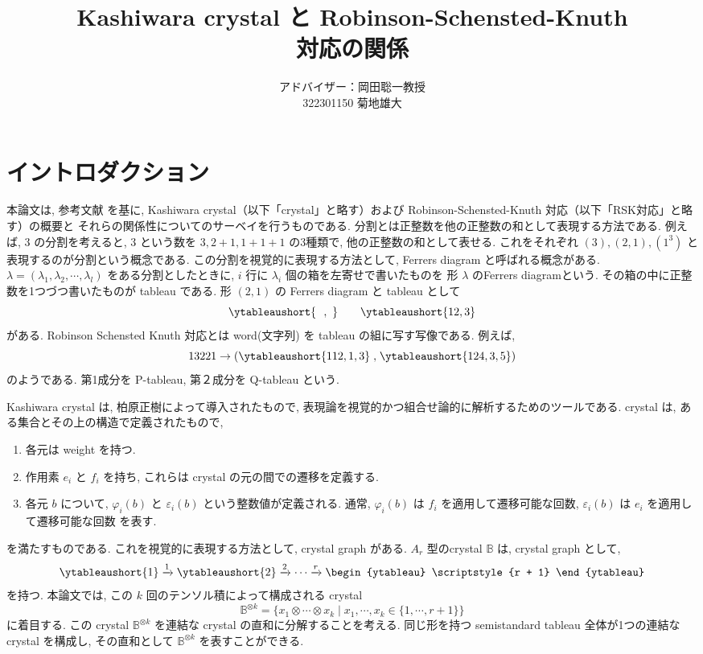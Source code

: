 \documentclass[
  a4paper, 
  12pt,
  ja=standard,
  xelatex,
  left=30truemm,
  right=30truemm,
  titlepage 
]{bxjsarticle}
\title{Kashiwara crystal と  Robinson-Schensted-Knuth \\ 対応の関係 \\[50pt]}
\author{
  アドバイザー：岡田聡一教授\\[20pt]
  322301150 \quad 菊地雄大
}
\date{}
\theoremstyle{definition}
\begin{document}
\maketitle
\thispagestyle{empty}

\setcounter{page}{1}

\tableofcontents
\clearpage

\section{イントロダクション}
本論文は, 参考文献 \cite{b2} を基に, 
Kashiwara crystal（以下「crystal」と略す）および Robinson-Schensted-Knuth 対応（以下「RSK対応」と略す）の概要と 
それらの関係性についてのサーベイを行うものである.
分割とは正整数を他の正整数の和として表現する方法である.
例えば, $3$ の分割を考えると, $3$ という数を $3, 2 + 1, 1 + 1 + 1$ の3種類で, 他の正整数の和として表せる.
これをそれぞれ $(3), (2, 1), (1^3)$ と表現するのが分割という概念である.
この分割を視覚的に表現する方法として, Ferrers diagram と呼ばれる概念がある.
$\lambda = (\lambda_1, \lambda_2, \cdots, \lambda_l)$ をある分割としたときに, 
$i$ 行に $\lambda_i$ 個の箱を左寄せで書いたものを 形 $\lambda$ のFerrers diagramという.
その箱の中に正整数を1つづつ書いたものが tableau である.
形 $(2, 1)$ の Ferrers diagram と tableau として
\[
\ytableaushort{~~,~} \qquad
\ytableaushort{12,3}
\]
がある.
Robinson Schensted Knuth 対応とは
word(文字列) を tableau の組に写す写像である. 
例えば, 
$$13221 
\rightarrow
\left( 
  \ytableaushort{112,1,3}
 \mathrel{,} 
  \ytableaushort{124,3,5}
\right)
$$
のようである.
第1成分を P-tableau, 第２成分を Q-tableau という.

Kashiwara crystal は, 柏原正樹によって導入されたもので, 
表現論を視覚的かつ組合せ論的に解析するためのツールである.
crystal は, ある集合とその上の構造で定義されたもので,
\begin{enumerate}
  \item 各元は weight を持つ.
  \item 作用素 $e_i$ と $f_i$ を持ち, これらは crystal の元の間での遷移を定義する.
  \item 各元 $b$ について, $\varphi_i(b)$ と $\varepsilon_i(b)$ という整数値が定義される.
  通常, $\varphi_i(b)$ は $f_i$ を適用して遷移可能な回数,
  $\varepsilon_i(b)$ は $e_i$ を適用して遷移可能な回数 を表す.
\end{enumerate}
を満たすものである. これを視覚的に表現する方法として, crystal graph がある.
$A_r$ 型のcrystal $\mathbb{B}$ は, crystal graph として,
\[
  \ytableaushort{1}
  \xrightarrow{1}
  \ytableaushort{2}
  \xrightarrow{2}
  \cdots
  \xrightarrow{r}
  \begin{ytableau}
    \scriptstyle{r + 1}
  \end{ytableau}
\]
を持つ. 
本論文では, この $k$ 回のテンソル積によって構成される crystal 
$$
\mathbb{B}^{\otimes k} = \{ x_1 \otimes \cdots \otimes x_k \mid x_1, \cdots, x_k \in \{ 1, \cdots, r + 1 \} \}
$$
に着目する.
この crystal $\mathbb{B}^{\otimes k}$ を連結な crystal の直和に分解することを考える.  
同じ形を持つ semistandard tableau 全体が1つの連結な crystal を構成し, その直和として $\mathbb{B}^{\otimes k}$ を表すことができる.
\end{document}
